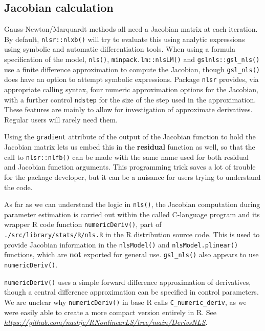 \documentclass[
]{article}
\begin{document}
\hypertarget{jacobian-calculation}{%
\subsection{Jacobian calculation}\label{jacobian-calculation}}

Gauss-Newton/Marquardt methods all need a Jacobian matrix at each
iteration. By default, \texttt{nlsr::nlxb()} will try to evaluate this
using analytic expressions using symbolic and automatic differentiation
tools. When using a formula specification of the model, \texttt{nls()},
\texttt{minpack.lm::nlsLM()} and \texttt{gslnls::gsl\_nls()} use a
finite difference approximation to compute the Jacobian, though
\texttt{gsl\_nls()} does have an option to attempt symbolic expressions.
Package \texttt{nlsr} provides, via appropriate calling syntax, four
numeric approximation options for the Jacobian, with a further control
\texttt{ndstep} for the size of the step used in the approximation.
These features are mainly to allow for investigation of approximate
derivatives. Regular users will rarely need them.

Using the \texttt{gradient} attribute of the output of the Jacobian
function to hold the Jacobian matrix lets us embed this in the
\textbf{residual} function as well, so that the call to
\texttt{nlsr::nlfb()} can be made with the same name used for both
residual and Jacobian function arguments. This programming trick saves a
lot of trouble for the package developer, but it can be a nuisance for
users trying to understand the code.

As far as we can understand the logic in \texttt{nls()}, the Jacobian
computation during parameter estimation is carried out within the called
C-language program and its wrapper R code function
\texttt{numericDeriv()}, part of \texttt{./src/library/stats/R/nls.R} in
the R distribution source code. This is used to provide Jacobian
information in the \texttt{nlsModel()} and \texttt{nlsModel.plinear()}
functions, which are \textbf{not} exported for general use.
\texttt{gsl\_nls()} also appears to use \texttt{numericDeriv()}.

\texttt{numericDeriv()} uses a simple forward difference approximation
of derivatives, though a central difference approximation can be
specified in control parameters. We are unclear why
\texttt{numericDeriv()} in base R calls \texttt{C\_numeric\_deriv}, as
we were easily able to create a more compact version entirely in R. See
\emph{\url{https://github.com/nashjc/RNonlinearLS/tree/main/DerivsNLS}}.
\end{document}
